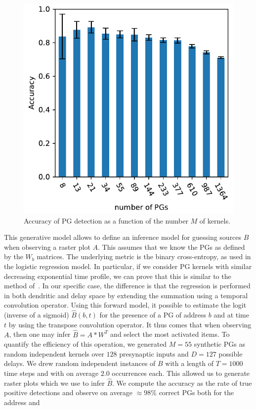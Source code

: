 \documentclass[11pt]{article}
\begin{document}
\begin{figure}
\vspace{-15pt}
\includegraphics[width=\linewidth]{figure_N_PGs.pdf}
\vspace{-25pt}
{
\caption{Accuracy of PG detection as a function of the number $M$ of kernels.
}
\label{fig:2}
}
\vspace{-10pt}
\end{figure}
This generative model allows to define an inference model for guessing sources $B$ when observing a raster plot $A$. This assumes that we know the PGs as defined by the $W_b$ matrices. The underlying metric is the binary cross-entropy, as used in the logistic regression model. In particular, if we consider PG kernels with similar decreasing exponential time profile, we can prove that this is similar to %
the method of~\citet{berens_fast_2012}. In our specific case, the difference is that the regression is performed in both dendritic and delay space by extending the summation using a temporal convolution operator. Using this forward model, it possible to estimate the logit (inverse of a sigmoid) $\hat{B}(b, t)$ for the presence of a PG of address $b$ and at time $t$ by using the transpose convolution operator. It thus comes that when observing $A$, then one may infer $\hat{B} = A \ast W^T$ and select the most activated items. To quantify the efficiency of this operation, we generated $M=55$ synthetic PGs as random independent kernels over $128$ presynaptic inputs and $D=127$ possible delays. We drew random independent instances of $B$ with a length of $T=1000$ time steps and with on average $2.0$ occurrences each. This allowed us to generate raster plots which we use to infer $\hat{B}$. We compute the accuracy as the rate of true positive detections and observe on average $\approx 98\%$ correct PGs both for the address and %
\end{document}

